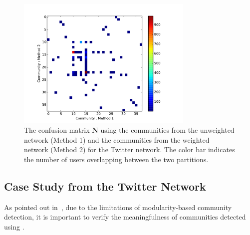 \documentclass[12pt]{article}
\begin{document}
\begin{figure}[h!]
  \centering
\includegraphics[width=0.75\textwidth]{Figures/confusion_matrix.pdf}
\caption{The confusion matrix $\mathbf{N}$ using the communities from the unweighted network (Method 1) and the communities from the weighted network (Method 2) for the Twitter network. The color bar indicates the number of users overlapping between the two partitions.}
\label{Fig-Confusion_Matrix_Twitter}
\end{figure}

\subsection{Case Study from the Twitter Network}

As pointed out in~\cite{good2010performance}, due to the limitations of modularity-based community detection, it is important to verify the meaningfulness of communities detected using . 
\end{document}
